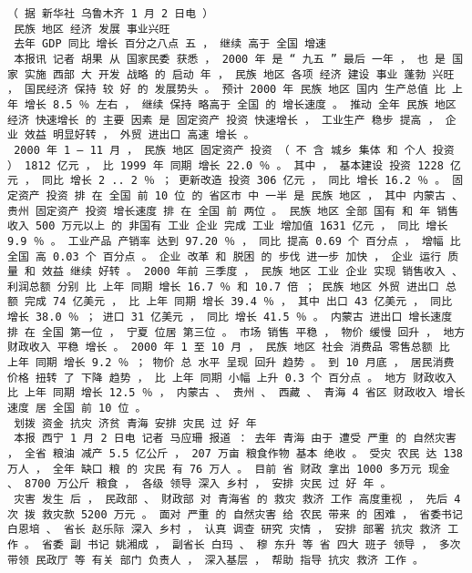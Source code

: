 \documentclass{article}
\begin{document}
\begin{Verbatim}[commandchars=\\\{\}]
 （ 据 新华社 乌鲁木齐 1 月 2 日电 ） 
 民族 地区 经济 发展 事业兴旺 
 去年 GDP 同比 增长 百分之八点 五 ， 继续 高于 全国 增速 
 本报讯 记者 胡果 从 国家民委 获悉 ， 2000 年 是 “ 九五 ” 最后 一年 ， 也 是 国家 实施 西部 大 开发 战略 的 启动 年 ， 民族 地区 各项 经济 建设 事业 蓬勃 兴旺 ， 国民经济 保持 较 好 的 发展势头 。 预计 2000 年 民族 地区 国内 生产总值 比 上年 增长 8.5 ％ 左右 ， 继续 保持 略高于 全国 的 增长速度 。 推动 全年 民族 地区 经济 快速增长 的 主要 因素 是 固定资产 投资 快速增长 ， 工业生产 稳步 提高 ， 企业 效益 明显好转 ， 外贸 进出口 高速 增长 。 
 2000 年 1 — 11 月 ， 民族 地区 固定资产 投资 （ 不 含 城乡 集体 和 个人 投资 ） 1812 亿元 ， 比 1999 年 同期 增长 22.0 ％ 。 其中 ， 基本建设 投资 1228 亿元 ， 同比 增长 2 .. 2 ％ ； 更新改造 投资 306 亿元 ， 同比 增长 16.2 ％ 。 固定资产 投资 排 在 全国 前 10 位 的 省区市 中 一半 是 民族 地区 ， 其中 内蒙古 、 贵州 固定资产 投资 增长速度 排 在 全国 前 两位 。 民族 地区 全部 国有 和 年 销售收入 500 万元以上 的 非国有 工业 企业 完成 工业 增加值 1631 亿元 ， 同比 增长 9.9 ％ 。 工业产品 产销率 达到 97.20 ％ ， 同比 提高 0.69 个 百分点 ， 增幅 比 全国 高 0.03 个 百分点 。 企业 改革 和 脱困 的 步伐 进一步 加快 ， 企业 运行 质量 和 效益 继续 好转 。 2000 年前 三季度 ， 民族 地区 工业 企业 实现 销售收入 、 利润总额 分别 比 上年 同期 增长 16.7 ％ 和 10.7 倍 ； 民族 地区 外贸 进出口 总额 完成 74 亿美元 ， 比 上年 同期 增长 39.4 ％ ， 其中 出口 43 亿美元 ， 同比 增长 38.0 ％ ； 进口 31 亿美元 ， 同比 增长 41.5 ％ 。 内蒙古 进出口 增长速度 排 在 全国 第一位 ， 宁夏 位居 第三位 。 市场 销售 平稳 ， 物价 缓慢 回升 ， 地方 财政收入 平稳 增长 。 2000 年 1 至 10 月 ， 民族 地区 社会 消费品 零售总额 比 上年 同期 增长 9.2 ％ ； 物价 总 水平 呈现 回升 趋势 。 到 10 月底 ， 居民消费 价格 扭转 了 下降 趋势 ， 比 上年 同期 小幅 上升 0.3 个 百分点 。 地方 财政收入 比 上年 同期 增长 12.5 ％ ， 内蒙古 、 贵州 、 西藏 、 青海 4 省区 财政收入 增长速度 居 全国 前 10 位 。 
 划拨 资金 抗灾 济贫 青海 安排 灾民 过 好 年 
 本报 西宁 1 月 2 日电 记者 马应珊 报道 ： 去年 青海 由于 遭受 严重 的 自然灾害 ， 全省 粮油 减产 5.5 亿公斤 ， 207 万亩 粮食作物 基本 绝收 。 受灾 农民 达 138 万人 ， 全年 缺口 粮 的 灾民 有 76 万人 。 目前 省 财政 拿出 1000 多万元 现金 、 8700 万公斤 粮食 ， 各级 领导 深入 乡村 ， 安排 灾民 过 好 年 。 
 灾害 发生 后 ， 民政部 、 财政部 对 青海省 的 救灾 救济 工作 高度重视 ， 先后 4 次 拨 救灾款 5200 万元 。 面对 严重 的 自然灾害 给 农民 带来 的 困难 ， 省委书记 白恩培 、 省长 赵乐际 深入 乡村 ， 认真 调查 研究 灾情 ， 安排 部署 抗灾 救济 工作 。 省委 副 书记 姚湘成 ， 副省长 白玛 、 穆 东升 等 省 四大 班子 领导 ， 多次 带领 民政厅 等 有关 部门 负责人 ， 深入基层 ， 帮助 指导 抗灾 救济 工作 。 

\end{Verbatim}
\end{document}
